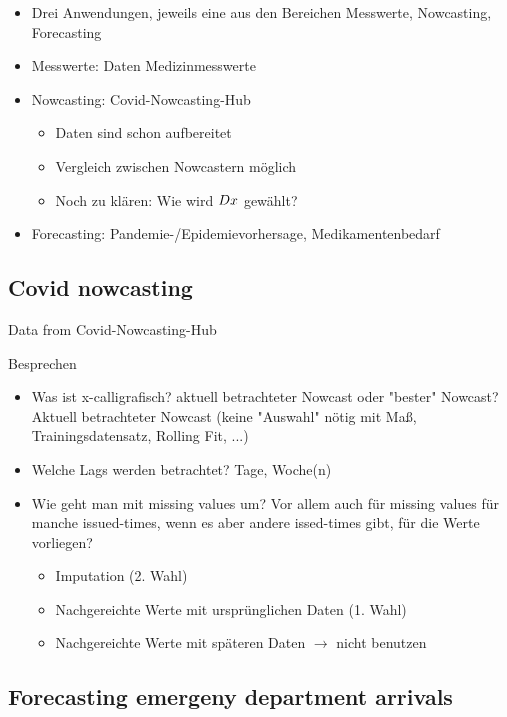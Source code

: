 \begin{itemize}
    \item Drei Anwendungen, jeweils eine aus den Bereichen Messwerte, Nowcasting, Forecasting
    \item Messwerte: Daten Medizinmesswerte
    \item Nowcasting: Covid-Nowcasting-Hub
    \begin{itemize}
        \item Daten sind schon aufbereitet
        \item Vergleich zwischen Nowcastern möglich
        \item Noch zu klären: Wie wird $Dx$ gewählt?
    \end{itemize}
    \item Forecasting: Pandemie-/Epidemievorhersage, Medikamentenbedarf
\end{itemize}

\subsection{Covid nowcasting}

Data from Covid-Nowcasting-Hub

Besprechen

\begin{itemize}
    \item Was ist x-calligrafisch? aktuell betrachteter Nowcast oder "bester" Nowcast? Aktuell betrachteter Nowcast (keine "Auswahl" nötig mit Maß, Trainingsdatensatz, Rolling Fit, ...)
    \item Welche Lags werden betrachtet? Tage, Woche(n)
    \item Wie geht man mit missing values um? Vor allem auch für missing values für manche issued-times, wenn es aber andere issed-times gibt, für die Werte vorliegen?
    \begin{itemize}
        \item Imputation (2. Wahl)
        \item Nachgereichte Werte mit ursprünglichen Daten (1. Wahl)
        \item Nachgereichte Werte mit späteren Daten $\rightarrow$ nicht benutzen
    \end{itemize}
\end{itemize}

\subsection{Forecasting emergeny department arrivals}

